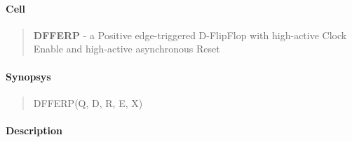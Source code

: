 \label{DFFERP}
\paragraph{Cell}
\begin{quote}
    \textbf{DFFERP} - a Positive edge-triggered D-FlipFlop with high-active Clock Enable and high-active asynchronous Reset
\end{quote}

\paragraph{Synopsys}
\begin{quote}
    DFFERP(Q, D, R, E, X)
\end{quote}

\paragraph{Description}

%

